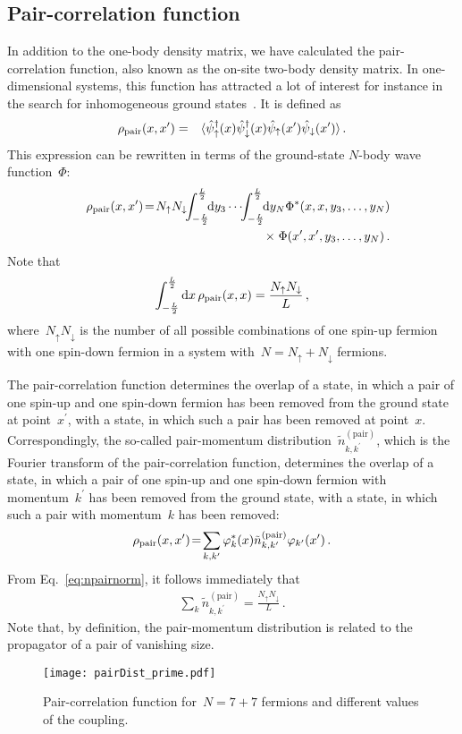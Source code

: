 \documentclass[pra,aps,groupedaddress,floatfix,twocolumn,superscriptaddress,showpacs,nofootinbib]{revtex4-1}
\newcommand{\nn}{\nonumber }
\newcommand{\be}{\begin{eqnarray}}
\newcommand{\ee}{\end{eqnarray}}
\begin{document}
{%
\subsection{Pair-correlation function}

{In addition to the one-body density matrix, we have calculated the
pair-correlation function, also known as the on-site two-body
density matrix. In one-dimensional systems,
this function has attracted a lot of interest for instance in the {search
for inhomogeneous ground states~\cite{PhysRevA.78.033607}. It} is defined as
%
\be
\rho_{\rm pair}(x,x^{\prime})&=&\langle \hat{\psi}^{\dagger}_{\uparrow}(x) \hat{\psi}^{\dagger}_{\downarrow}(x)
 \hat{\psi}_{\uparrow}(x^{\prime}) \hat{\psi}_{\downarrow}(x^{\prime})\rangle\,.
\ee
%
This expression can be rewritten in terms of the ground-state $N$-body wave function~$\Phi$:
%
\be
&& \rho_{\rm pair}(x,x^{\prime})\!=\! N_{\uparrow}N_{\downarrow}
\!\!\int_{-\frac{L}{2}}^{\frac{L}{2}}\!\!{\rm d}y_{3}\cdots\!\!\int_{-\frac{L}{2}}^{\frac{L}{2}}\!\! {\rm d}y_{N}\Phi^{\ast}(x,x,y_3,\dots,y_N)\nn\\
&& \qquad\qquad\qquad\qquad\qquad\qquad\;\times\; \Phi(x^{\prime},x^{\prime},y_3,\dots,y_N)\,.
\ee
%
Note that
%
\be
\int_{-\frac{L}{2}}^{\frac{L}{2}}{\rm d}x\,\rho_{\rm pair}(x,x)= \frac{N_{\uparrow}N_{\downarrow}}{L}\,,\label{eq:npairnorm}
\ee
%
where~$N_{\uparrow}N_{\downarrow}$ is the number of all possible combinations of one spin-up
fermion with one spin-down fermion in a system with~$N=N_{\uparrow}+N_{\downarrow}$ fermions.

The pair-correlation function determines the overlap of a state,
in which a pair of one spin-up and one spin-down fermion has been removed
from the ground state at point~$x^{\prime}$, with a state, in which such a pair has
been removed at point~$x$.
Correspondingly, the so-called pair-momentum distribution~$\tilde{n}_{k,k^{\prime}}^{(\text{pair})}$,
which is the Fourier transform of
the pair-correlation function, determines the overlap of a state,
in which a pair of one spin-up and one spin-down fermion with momentum~$k^{\prime}$ has been removed
from the ground state, with a state, in which such a pair with momentum~$k$ has
been removed:
%
\be
\rho_{\rm pair}(x,x^{\prime})\!=\!
\sum_{k,k^{\prime}} \varphi_k^{\ast}(x)\tilde{n}_{k,k^{\prime}}^{(\text{pair})}\varphi_{k^{\prime}}(x^{\prime})\,.
\label{eq:momdistdef}
\ee
%
From Eq.~\eqref{eq:npairnorm}, it follows immediately that
%
\be
\sum_k \tilde{n}_{k,k^{\prime}}^{(\text{pair})} = \frac{N_{\uparrow}N_{\downarrow}}{L}\,.
\ee
%
Note that, by definition, the pair-momentum distribution is related to the propagator of a pair of vanishing size.
%
\begin{figure}[t]
 \texttt{[image: pairDist\_prime.pdf]}
 \caption{\label{Fig:N2K} {Pair-correlation function
 for~$N=7+7$ fermions and different values of the coupling.}}
\end{figure}
%

}}
\end{document}
